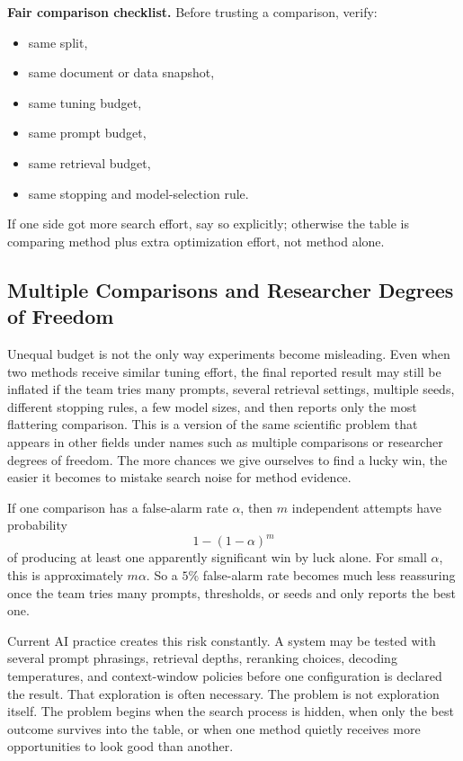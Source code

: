\begin{thinkingtool}
\textbf{Fair comparison checklist.} Before trusting a comparison, verify:
\begin{itemize}[leftmargin=*]
\item same split,
\item same document or data snapshot,
\item same tuning budget,
\item same prompt budget,
\item same retrieval budget,
\item same stopping and model-selection rule.
\end{itemize}
If one side got more search effort, say so explicitly; otherwise the table is comparing method plus extra optimization effort, not method alone.
\end{thinkingtool}

\subsection{Multiple Comparisons and Researcher Degrees of Freedom}

Unequal budget is not the only way experiments become misleading. Even when two methods receive similar tuning effort, the final reported result may still be inflated if the team tries many prompts, several retrieval settings, multiple seeds, different stopping rules, a few model sizes, and then reports only the most flattering comparison. This is a version of the same scientific problem that appears in other fields under names such as multiple comparisons or researcher degrees of freedom. The more chances we give ourselves to find a lucky win, the easier it becomes to mistake search noise for method evidence.

\begin{mathlens}
If one comparison has a false-alarm rate \(\alpha\), then \(m\) independent attempts have probability
\[
1-(1-\alpha)^m
\]
of producing at least one apparently significant win by luck alone. For small \(\alpha\), this is approximately \(m\alpha\). So a \(5\%\) false-alarm rate becomes much less reassuring once the team tries many prompts, thresholds, or seeds and only reports the best one.
\end{mathlens}

Current AI practice creates this risk constantly. A system may be tested with several prompt phrasings, retrieval depths, reranking choices, decoding temperatures, and context-window policies before one configuration is declared the result. That exploration is often necessary. The problem is not exploration itself. The problem begins when the search process is hidden, when only the best outcome survives into the table, or when one method quietly receives more opportunities to look good than another.


